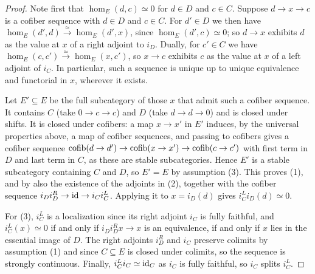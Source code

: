 	\begin{proof}
		Note first that $\hom_E(d,c) \simeq 0$ for $d \in D$ and $c \in C$. Suppose $d \to x \to c$ is a cofiber sequence with $d \in D$ and $c \in C$. For $d' \in D$ we then have $\hom_E(d',d) \xrightarrow{\simeq} \hom_E(d',x)$, since $\hom_E(d',c) \simeq 0$; so $d \to x$ exhibits $d$ as the value at $x$ of a right adjoint to $i_D$. Dually, for $c' \in C$ we have $\hom_E(c,c') \xrightarrow{\simeq} \hom_E(x,c')$, so $x \to c$ exhibits $c$ as the value at $x$ of a left adjoint of $i_C$. In particular, such a sequence is unique up to unique equivalence and functorial in $x$, wherever it exists.

		Let $E' \subseteq E$ be the full subcategory of those $x$ that admit such a cofiber sequence. It contains $C$ (take $0 \to c \to c$) and $D$ (take $d \to d \to 0$) and is closed under shifts. It is closed under cofibers: a map $x \to x'$ in $E'$ induces, by the universal properties above, a map of cofiber sequences, and passing to cofibers gives a cofiber sequence $\operatorname{cofib}(d \to d') \to \operatorname{cofib}(x \to x') \to \operatorname{cofib}(c \to c')$ with first term in $D$ and last term in $C$, as these are stable subcategories. Hence $E'$ is a stable subcategory containing $C$ and $D$, so $E' = E$ by assumption (3). This proves (1), and by \cite[Proposition~5.2.4.2]{lurie2009HTT} also the existence of the adjoints in (2), together with the cofiber sequence $i_Di_D^R \to \operatorname{id} \to i_Ci_C^L$. Applying it to $x = i_D(d)$ gives $i_C^Li_D(d) \simeq 0$.

		For (3), $i_C^L$ is a localization since its right adjoint $i_C$ is fully faithful, and $i_C^L(x) \simeq 0$ if and only if $i_Di_D^R x \to x$ is an equivalence, if and only if $x$ lies in the essential image of $D$. The right adjoints $i_D^R$ and $i_C$ preserve colimits by assumption (1) and since $C \subseteq E$ is closed under colimits, so the sequence is strongly continuous. Finally, $i_C^L i_C \simeq \operatorname{id}_C$ as $i_C$ is fully faithful, so $i_C$ splits $i_C^L$.
	\end{proof}

